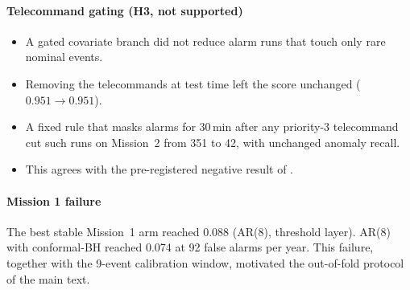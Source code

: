 \documentclass[preprint,12pt,authoryear]{elsarticle}
\begin{document}
\paragraph{Telecommand gating (H3, not supported)}
\begin{itemize}
\item A gated covariate branch did not reduce alarm runs that touch only rare nominal
  events.
\item Removing the telecommands at test time left the score unchanged ($0.951\to0.951$).
\item A fixed rule that masks alarms for 30\,min after any priority-3 telecommand cut such
  runs on Mission~2 from 351 to 42, with unchanged anomaly recall.
\item This agrees with the pre-registered negative result of \citet{sahin2026tccad}.
\end{itemize}

\paragraph{Mission 1 failure}
The best stable Mission~1 arm reached 0.088 (AR(8), threshold layer). AR(8) with
conformal-BH reached 0.074 at 92 false alarms per year. This failure, together with the
9-event calibration window, motivated the out-of-fold protocol of the main text.



\end{document}
